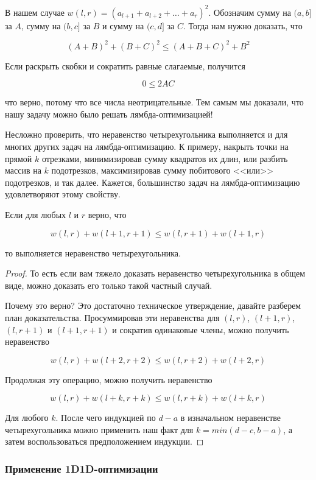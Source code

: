 В нашем случае $w(l, r) = (a_{l + 1} + a_{l + 2} + \ldots + a_r)^2$. Обозначим сумму на $(a, b]$ за $A$, сумму на $(b, c]$ за $B$ и сумму на $(c, d]$ за $C$. Тогда нам нужно доказать, что

$$(A + B)^2 + (B + C)^2 \le (A + B + C)^2 + B^2$$

Если раскрыть скобки и сократить равные слагаемые, получится

$$0 \le 2AC$$

что верно, потому что все числа неотрицательные. Тем самым мы доказали, что нашу задачу можно было решать лямбда-оптимизацией!

Несложно проверить, что неравенство четырехугольника выполняется и для многих других задач на лямбда-оптимизацию. К примеру, накрыть точки на прямой $k$ отрезками, минимизировав сумму квадратов их длин, или разбить массив на $k$ подотрезков, максимизировав сумму побитового <<или>> подотрезков, и так далее. Кажется, большинство задач на лямбда-оптимизацию удовлетворяют этому свойству.

\begin{observation}
    Если для любых $l$ и $r$ верно, что

    $$w(l, r) + w(l + 1, r + 1) \le w(l, r + 1) + w(l + 1, r)$$

    то выполняется неравенство четырехугольника.
\end{observation}

\begin{proof}
    То есть если вам тяжело доказать неравенство четырехугольника в общем виде, можно доказать его только такой частный случай.

    Почему это верно? Это достаточно техническое утверждение, давайте разберем план доказательства. Просуммировав эти неравенства для $(l, r)$, $(l + 1, r)$, $(l, r + 1)$ и $(l + 1, r + 1)$ и сократив одинаковые члены, можно получить неравенство

    $$w(l, r) + w(l + 2, r + 2) \le w(l, r + 2) + w(l + 2, r)$$

    Продолжая эту операцию, можно получить неравенство

    $$w(l, r) + w(l + k, r + k) \le w(l, r + k) + w(l + k, r)$$

    Для любого $k$. После чего индукцией по $d - a$ в изначальном неравенстве четырехугольника можно применить наш факт для $k = min(d - c, b - a)$, а затем воспользоваться предположением индукции.
\end{proof}

\subsubsection{Применение 1D1D-оптимизации}

